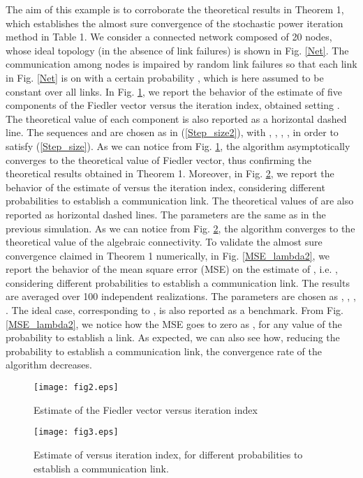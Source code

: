 \documentclass[10pt,twocolumn]{IEEEtran}
\begin{document}
 The aim of this example is to corroborate the theoretical results in Theorem 1, which establishes the almost sure convergence of the stochastic power iteration method in Table 1. We consider a connected network composed of 20 nodes, whose ideal topology (in the absence of link failures) is shown in Fig. \ref{Net}. The communication among nodes is impaired by random link failures so that each link in Fig. \ref{Net} is on with a certain probability , which is here assumed to be constant over all links.
In Fig. \ref{Fiedler}, we report the behavior of the estimate of five components of the Fiedler vector   versus the iteration index, obtained setting . The theoretical value of each component is also reported as a horizontal dashed line. The sequences  and  are chosen as in (\ref{Step_size2}), with , , , , in order to satisfy (\ref{Step_size}). As we can notice from Fig. \ref{Fiedler}, the algorithm asymptotically converges to the theoretical value of Fiedler vector, thus confirming the theoretical results obtained in Theorem 1.
Moreover, in Fig. \ref{lambda2}, we report the behavior of the estimate of  versus the iteration index, considering different probabilities to establish a communication link. The theoretical values of  are also reported as horizontal dashed lines. The parameters are the same as in the previous simulation. As we can notice from Fig. \ref{lambda2}, the algorithm converges to the theoretical value of the algebraic connectivity.
To validate the almost sure convergence claimed in Theorem 1 numerically, in Fig. \ref{MSE_lambda2}, we report the behavior of the mean square error (MSE) on the estimate of , i.e. , considering different probabilities to establish a communication link. The results are averaged over 100 independent realizations. The parameters are chosen as , , , . The ideal case, corresponding to , is also reported as a benchmark. From Fig. \ref{MSE_lambda2}, we notice how the MSE goes to zero as , for any value of the probability  to establish a link. As expected, we can also see how, reducing the probability to establish a communication link, the convergence rate of the algorithm decreases.

\begin{figure}[t]
\centering
\texttt{[image: fig2.eps]}
  \caption{Estimate of the Fiedler vector versus iteration index}\label{Fiedler}
\end{figure}

\begin{figure}[t]
\centering
\texttt{[image: fig3.eps]}
  \caption{Estimate of  versus iteration index, for different probabilities to establish a communication link.}\label{lambda2}
\end{figure}
\end{document}
